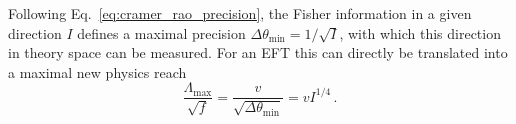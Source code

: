 Following Eq.~\eqref{eq:cramer_rao_precision}, the Fisher information in a given direction
$I$ defines a maximal precision
$\Delta \theta_{\text{min}} = 1 / \sqrt{I}$, with which this direction
in theory space can be measured. For an EFT this can directly be
translated into a maximal new physics reach
%
\begin{equation}
  \frac {\Lambda_{\text{max}}} {\sqrt{f}} = \frac v {\sqrt{\Delta \theta_{\text{min}}}} =  v I^{1/4} \,.
\end{equation}



